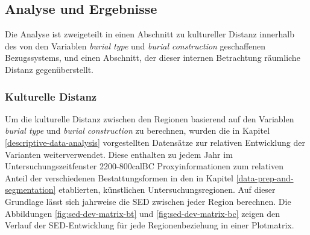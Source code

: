 \documentclass[openany,twoside,twocolumn]{book}
\begin{document}
\hypertarget{analyse-und-ergebnisse}{%
\subsection{Analyse und Ergebnisse}\label{analyse-und-ergebnisse}}

Die Analyse ist zweigeteilt in einen Abschnitt zu kultureller Distanz
innerhalb des von den Variablen \emph{burial type} und \emph{burial
construction} geschaffenen Bezugssystems, und einen Abschnitt, der
dieser internen Betrachtung räumliche Distanz gegenüberstellt.

\hypertarget{kulturelle-distanz}{%
\subsubsection{Kulturelle Distanz}\label{kulturelle-distanz}}

Um die kulturelle Distanz zwischen den Regionen basierend auf den
Variablen \emph{burial type} und \emph{burial construction} zu
berechnen, wurden die in Kapitel \ref{descriptive-data-analysis}
vorgestellten Datensätze zur relativen Entwicklung der Varianten
weiterverwendet. Diese enthalten zu jedem Jahr im
Untersuchungszeitfenster 2200-800calBC Proxyinformationen zum relativen
Anteil der verschiedenen Bestattungsformen in den in Kapitel
\ref{data-prep-and-segmentation} etablierten, künstlichen
Untersuchungsregionen. Auf dieser Grundlage lässt sich jahrweise die SED
zwischen jeder Region berechnen. Die Abbildungen
\ref{fig:sed-dev-matrix-bt} und \ref{fig:sed-dev-matrix-bc} zeigen den
Verlauf der SED-Entwicklung für jede Regionenbeziehung in einer
Plotmatrix.
\end{document}
